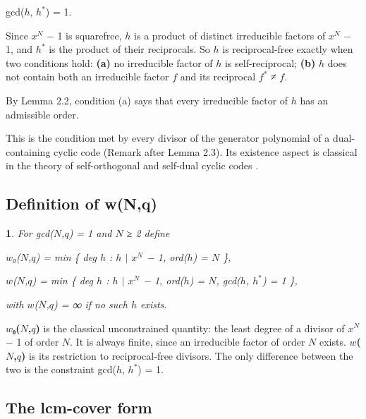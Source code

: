 \documentclass[pdflatex,sn-mathphys-num]{sn-jnl}
\theoremstyle{thmstyleone}
\theoremstyle{thmstylethree}
\newcommand{\defnname}{}
\newtheorem*{defninner}{\defnname}
\newenvironment{defn}[1]{\renewcommand{\defnname}{#1}\begin{defninner}}{\end{defninner}}
\begin{document}
\begin{center}gcd(\(h\), \(h^{*}\)) = 1.\end{center}

Since \(x^N\) − 1 is squarefree, \(h\) is a product of distinct irreducible factors of \(x^N\) − 1, and \(h^{*}\) is the product of their reciprocals. So \(h\) is reciprocal-free exactly when two conditions hold: \textbf{(a)} no irreducible factor of \(h\) is self-reciprocal; \textbf{(b)} \(h\) does not contain both an irreducible factor \(f\) and its reciprocal \(f^{*}\) ≠ \(f\).

By Lemma 2.2, condition (a) says that every irreducible factor of \(h\) has an admissible order.

This is the condition met by every divisor of the generator polynomial of a dual-containing cyclic code (Remark after Lemma 2.3). Its existence aspect is classical in the theory of self-orthogonal and self-dual cyclic codes \cite{ST,JLX}.

\subsection{Definition of w(N,q)}

\begin{defn}{Definition 4.1}

For gcd(\(N\),\(q\)) = 1 and \(N\) ≥ 2 define

\begin{center}\(w\)₀(\(N\),\(q\)) = min \{ deg \(h\) : \(h\) \(\mid\) \(x^N\) − 1, ord(\(h\)) = \(N\) \},\end{center}

\begin{center}\(w\)(\(N\),\(q\)) = min \{ deg \(h\) : \(h\) \(\mid\) \(x^N\) − 1, ord(\(h\)) = \(N\), gcd(\(h\), \(h^{*}\)) = 1 \},\end{center}

with \(w\)(\(N\),\(q\)) = ∞ if no such \(h\) exists.

\end{defn}

\textbf{\(w\)₀(\(N\),\(q\))} is the classical unconstrained quantity: the least degree of a divisor of \(x^N\) − 1 of order \(N\). It is always finite, since an irreducible factor of order \(N\) exists. \textbf{\(w\)(\(N\),\(q\))} is its restriction to reciprocal-free divisors. The only difference between the two is the constraint gcd(\(h\), \(h^{*}\)) = 1.

\subsection{The lcm-cover form}
\end{document}
